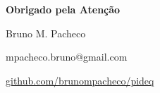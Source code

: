 \documentclass[t]{beamer}
\begin{document}
{
\begin{frame}[plain]
\vspace{15mm}
\begin{center}
\textcolor{cinza}{
\textbf{Obrigado pela Atenção}
}
\end{center}
\vspace{-6mm}
\begin{center}
\textcolor{cinza}{\scriptsize{
	Bruno M. Pacheco
}}
\end{center}
\vspace{-6mm}
\begin{center}
\textcolor{cinza}{\scriptsize{
mpacheco.bruno@gmail.com
}}
\end{center}
\vspace{-6mm}
\begin{center}
\textcolor{cinza}{\scriptsize{
\href{https://github.com/brunompacheco/pideq}{github.com/brunompacheco/pideq}
}}
\end{center}
\end{frame}
}
\end{document}
